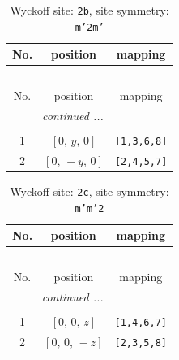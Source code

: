 \documentclass[fleqn,8pt]{jsarticle}
\begin{document}
\begin{longtable}{ccc}
\caption{Wyckoff site: {\tt 2b}, site symmetry: {\tt m'2m'}}
 \\
 \hline \hline
No. & position & mapping \\ \hline \endfirsthead

\multicolumn{2}{l}{\tablename\ \thetable{}} \\
 \hline \hline
No. & position & mapping \\ \hline \endhead

 \hline \hline
\multicolumn{2}{r}{\footnotesize\it continued ...} \\ \endfoot

 \hline \hline
\multicolumn{2}{r}{} \\ \endlastfoot

1 & $\left[ 0,\, y,\, 0 \right]$ & {\tt [1,3,6,8]} \\ \hline
2 & $\left[ 0,\, - y,\, 0 \right]$ & {\tt [2,4,5,7]} \\
\end{longtable}
\renewcommand{\arraystretch}{1.2}
\begin{longtable}{ccc}
\caption{Wyckoff site: {\tt 2c}, site symmetry: {\tt m'm'2}}
 \\
 \hline \hline
No. & position & mapping \\ \hline \endfirsthead

\multicolumn{2}{l}{\tablename\ \thetable{}} \\
 \hline \hline
No. & position & mapping \\ \hline \endhead

 \hline \hline
\multicolumn{2}{r}{\footnotesize\it continued ...} \\ \endfoot

 \hline \hline
\multicolumn{2}{r}{} \\ \endlastfoot

1 & $\left[ 0,\, 0,\, z \right]$ & {\tt [1,4,6,7]} \\ \hline
2 & $\left[ 0,\, 0,\, - z \right]$ & {\tt [2,3,5,8]} \\
\end{longtable}
\renewcommand{\arraystretch}{1.2}
\end{document}
